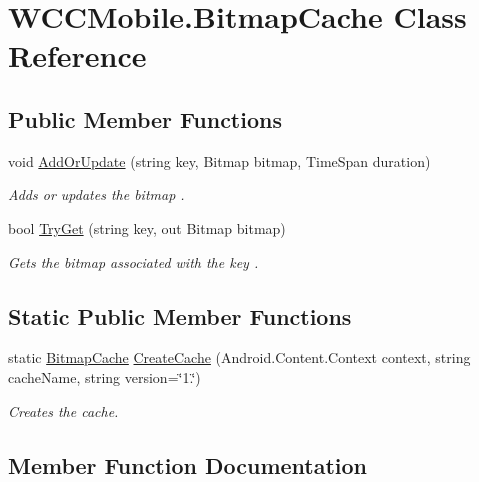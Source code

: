 \hypertarget{class_w_c_c_mobile_1_1_bitmap_cache}{}\section{W\+C\+C\+Mobile.\+Bitmap\+Cache Class Reference}
\label{class_w_c_c_mobile_1_1_bitmap_cache}
\subsection*{Public Member Functions}
\begin{DoxyCompactItemize}
\item 
void \hyperlink{class_w_c_c_mobile_1_1_bitmap_cache_abc1bb6bb92fae6341a28be220ef526b5}{Add\+Or\+Update} (string key, Bitmap bitmap, Time\+Span duration)
\begin{DoxyCompactList}\small\item\em Adds or updates the {\itshape bitmap} . \end{DoxyCompactList}\item 
bool \hyperlink{class_w_c_c_mobile_1_1_bitmap_cache_aef6dc59115bd31284061164824016b48}{Try\+Get} (string key, out Bitmap bitmap)
\begin{DoxyCompactList}\small\item\em Get\textquotesingle{}s the {\itshape bitmap}  associated with the {\itshape key} . \end{DoxyCompactList}\end{DoxyCompactItemize}
\subsection*{Static Public Member Functions}
\begin{DoxyCompactItemize}
\item 
static \hyperlink{class_w_c_c_mobile_1_1_bitmap_cache}{Bitmap\+Cache} \hyperlink{class_w_c_c_mobile_1_1_bitmap_cache_a82500ffb74a2f16fac9f59b385cd7ee6}{Create\+Cache} (Android.\+Content.\+Context context, string cache\+Name, string version=\char`\"{}1.\char`\"{})
\begin{DoxyCompactList}\small\item\em Creates the cache. \end{DoxyCompactList}\end{DoxyCompactItemize}


\subsection{Member Function Documentation}
